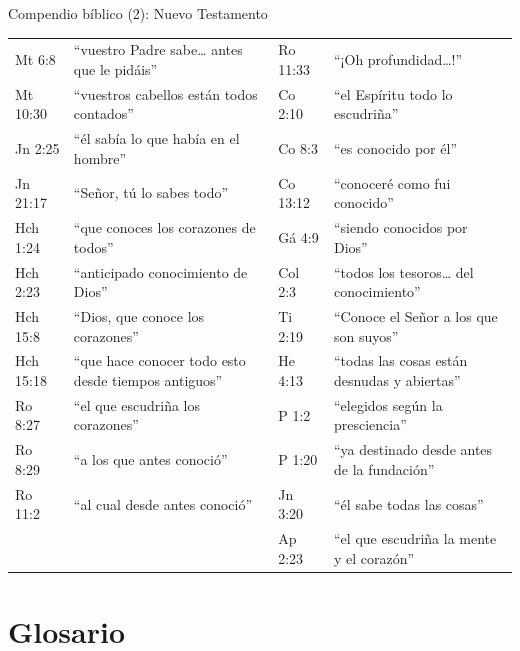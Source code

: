 \begin{frame}{Compendio bíblico (2): Nuevo Testamento}
\fontsize{6.2}{7.4}\selectfont\renewcommand{\arraystretch}{1.06}
\begin{tabular}{@{}>{\RaggedRight\arraybackslash}p{1.5cm}>{\RaggedRight\arraybackslash}p{4.4cm}|>{\RaggedRight\arraybackslash}p{1.5cm}>{\RaggedRight\arraybackslash}p{4.4cm}@{}}
\toprule
Mt 6:8 & ``vuestro Padre sabe\ldots{} antes que le pidáis'' & Ro 11:33 & ``¡Oh profundidad\ldots!'' \\
Mt 10:30 & ``vuestros cabellos están todos contados'' & 1 Co 2:10 & ``el Espíritu todo lo escudriña'' \\
Jn 2:25 & ``él sabía lo que había en el hombre'' & 1 Co 8:3 & ``es conocido por él'' \\
Jn 21:17 & ``Señor, tú lo sabes todo'' & 1 Co 13:12 & ``conoceré como fui conocido'' \\
Hch 1:24 & ``que conoces los corazones de todos'' & Gá 4:9 & ``siendo conocidos por Dios'' \\
Hch 2:23 & ``anticipado conocimiento de Dios'' & Col 2:3 & ``todos los tesoros\ldots{} del conocimiento'' \\
Hch 15:8 & ``Dios, que conoce los corazones'' & 2 Ti 2:19 & ``Conoce el Señor a los que son suyos'' \\
Hch 15:18 & ``que hace conocer todo esto desde tiempos antiguos'' & He 4:13 & ``todas las cosas están desnudas y abiertas'' \\
Ro 8:27 & ``el que escudriña los corazones'' & 1 P 1:2 & ``elegidos según la presciencia'' \\
Ro 8:29 & ``a los que antes conoció'' & 1 P 1:20 & ``ya destinado desde antes de la fundación'' \\
Ro 11:2 & ``al cual desde antes conoció'' & 1 Jn 3:20 & ``él sabe todas las cosas'' \\
 & & Ap 2:23 & ``el que escudriña la mente y el corazón'' \\
\bottomrule
\end{tabular}
\end{frame}

\section{Glosario}

